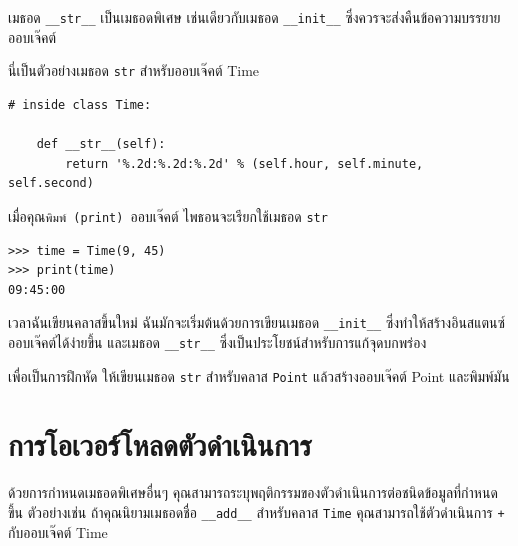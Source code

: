 เมธอด \verb"__str__" เป็นเมธอดพิเศษ เช่นเดียวกับเมธอด \verb"__init__" ซึ่งควรจะส่งคืนข้อความบรรยายออบเจ๊คต์

นี่เป็นตัวอย่างเมธอด {\tt str} สำหรับออบเจ๊คต์ Time

\begin{verbatim}
# inside class Time:

    def __str__(self):
        return '%.2d:%.2d:%.2d' % (self.hour, self.minute, self.second)
\end{verbatim}
%
เมื่อคุณ{\tt พิมพ์ (print) }ออบเจ๊คต์ ไพธอนจะเรียกใช้เมธอด {\tt str}

\begin{verbatim}
>>> time = Time(9, 45)
>>> print(time)
09:45:00
\end{verbatim}
%

เวลาฉันเขียนคลาสขึ้นใหม่ ฉันมักจะเริ่มต้นด้วยการเขียนเมธอด \verb"__init__" ซึ่งทำให้สร้างอินสแตนซ์ออบเจ๊คต์ได้ง่ายขึ้น 
และเมธอด \verb"__str__"  ซึ่งเป็นประโยชน์สำหรับการแก้จุดบกพร่อง


เพื่อเป็นการฝึกหัด ให้เขียนเมธอด {\tt str} สำหรับคลาส {\tt Point} แล้วสร้างออบเจ๊คต์ Point และพิมพ์มัน

\section{การโอเวอร์โหลดตัวดำเนินการ} %
\label{operator.overloading}


ด้วยการกำหนดเมธอดพิเศษอื่นๆ คุณสามารถระบุพฤติกรรมของตัวดำเนินการต่อชนิดข้อมูลที่กำหนดขึ้น 
ตัวอย่างเช่น ถ้าคุณนิยามเมธอดชื่อ \verb"__add__" สำหรับคลาส {\tt Time} คุณสามารถใช้ตัวดำเนินการ {\tt +} กับออบเจ๊คต์ Time

